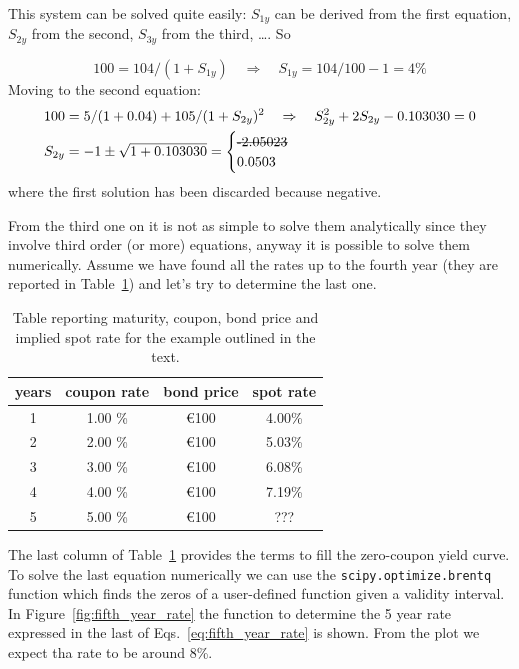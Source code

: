 This system can be solved quite easily: $S_{1y}$ can be derived from the first equation, $S_{2y}$ from the second, $S_{3y}$ from the third, \ldots. So

\begin{equation}
100 = 104 / (1 + S_{1y})\quad\Rightarrow\quad S_{1y} = 104/100 - 1 = 4\%
\end{equation}
Moving to the second equation:
\begin{equation}
\begin{split}
& 100 = 5 / (1 + 0.04) + 105 / (1 + S_{2y})^{2}\quad\Rightarrow\quad S_{2y}^2  + 2 S_{2y}  - 0.103030 = 0 \\
& S_{2y} = - 1 \pm \sqrt{1 + 0.103030} = \begin{cases}\text{\sout{-2.05023}} \\ 0.0503\end{cases}
\end{split}
\end{equation}
where the first solution has been discarded because negative.

From the third one on it is not as simple to solve them analytically since they involve third order (or more) equations, anyway it is possible to solve them numerically.
Assume we have found all the rates up to the fourth year (they are reported in Table~\ref{tab:rates}) and let's try to determine the last one.

\begin{table}[htb]
\begin{center}
\begin{tabular}{|c|c|c|c|}
\hline
\textbf{years} & \textbf{coupon rate} & \textbf{bond price} & \textbf{spot rate} \\
\hline
1 & 1.00 \% & \euro{100} & 4.00\% \\
\hline
2 & 2.00 \% & \euro{100} & 5.03\% \\
\hline
3 & 3.00 \% & \euro{100} & 6.08\% \\
\hline
4 & 4.00 \% & \euro{100} & 7.19\% \\
\hline
5 & 5.00 \% & \euro{100} & ??? \\
\hline
\end{tabular}
\end{center}
\caption{Table reporting maturity, coupon, bond price and implied spot rate for the example outlined in the text.}
\label{tab:rates}
\end{table}
The last column of Table~\ref{tab:rates} provides the terms to fill the zero-coupon yield curve.
To solve the last equation numerically we can use the \texttt{scipy.optimize.brentq} function which finds the zeros of a user-defined function given a validity interval.
In Figure~\ref{fig:fifth_year_rate} the function to determine the 5 year rate expressed in the last of Eqs.~\ref{eq:fifth_year_rate} is shown. From the plot we expect tha rate to be around 8\%.


